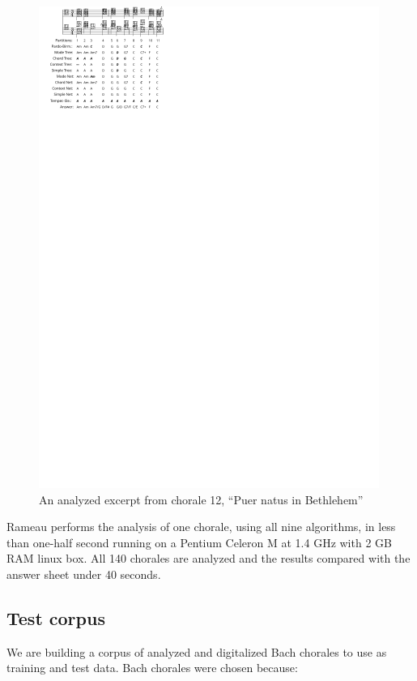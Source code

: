 \documentclass{article}
\begin{document}
\begin{figure}
  \centering
  \includegraphics[scale=4]{coral-012}
  \caption{An analyzed excerpt from chorale 12, ``Puer natus in Bethlehem''}
  \label{fig:coral-12}
\end{figure}

Rameau performs the analysis of one chorale, using all nine
algorithms, in less than one-half second running on a Pentium Celeron
M at 1.4 GHz with 2 GB RAM linux box. All 140 chorales are analyzed
and the results compared with the answer sheet under 40 seconds.

\subsection{Test corpus}
\label{sec:test-corpus}

We are building a corpus of analyzed and digitalized Bach chorales to
use as training and test data. Bach chorales were chosen because:
\end{document}

